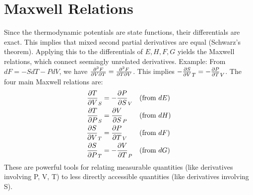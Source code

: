 \documentclass[10pt, letterpaper]{article}
\begin{document}
\section{Maxwell Relations}
Since the thermodynamic potentials are state functions, their differentials are exact. This implies that mixed second partial derivatives are equal (Schwarz's theorem). Applying this to the differentials of $E, H, F, G$ yields the Maxwell relations, which connect seemingly unrelated derivatives.
Example: From $dF = -S dT - P dV$, we have $\pdv[2]{F}{V}{T} = \pdv[2]{F}{T}{V}$.
This implies $-\pdv{S}{V}_{T} = -\pdv{P}{T}_{V}$.
The four main Maxwell relations are:
\begin{align}
    \pdv{T}{V}_{S} &= -\pdv{P}{S}_{V} && (\text{from } dE) \\
    \pdv{T}{P}_{S} &= \pdv{V}{S}_{P} && (\text{from } dH) \\
    \pdv{S}{V}_{T} &= \pdv{P}{T}_{V} && (\text{from } dF) \label{eq:maxwell_F} \\
    \pdv{S}{P}_{T} &= -\pdv{V}{T}_{P} && (\text{from } dG) \label{eq:maxwell_G}
\end{align}
These are powerful tools for relating measurable quantities (like derivatives involving P, V, T) to less directly accessible quantities (like derivatives involving S).
\end{document}
